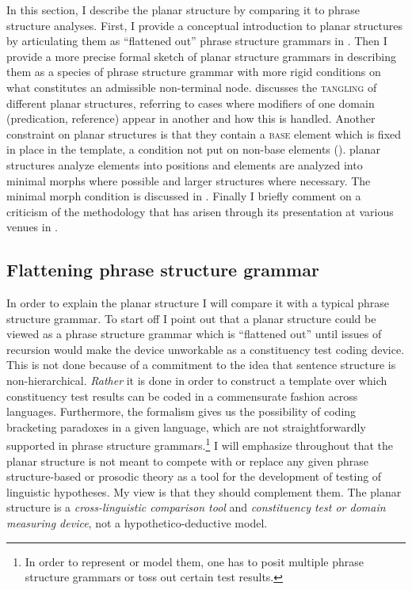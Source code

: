 \documentclass[output=paper,hidelinks]{langscibook}
\begin{document}
In this section, I describe the planar structure by comparing it to phrase structure analyses. First, I provide a conceptual introduction to planar structures by articulating them as ``flattened out'' phrase structure grammars in . Then I provide a more precise formal sketch of planar structure grammars in  describing them as a species of phrase structure grammar with more rigid conditions on what constitutes an admissible non-terminal node.  discusses the \textsc{tangling} of different planar structures, referring to cases where modifiers of one domain (predication, reference) appear in another and how this is handled. Another constraint on planar structures is that they contain a \textsc{base} element which is fixed in place in the template, a condition not put on non-base elements (). planar structures analyze elements into positions and elements are analyzed into minimal morphs where possible and larger structures where necessary. The minimal morph condition is discussed in .
Finally I briefly comment on a criticism of the methodology that has arisen through its presentation at various venues in .

\newpage
\subsection{Flattening phrase structure grammar}
\label{sec:flattening}
In order to explain the planar structure I will compare it with a typical phrase structure grammar. To start off I point out that a planar structure could be viewed as a phrase structure grammar which is ``flattened out'' until issues of recursion would make the device unworkable as a constituency test coding device. This is not done because of a commitment to the idea that sentence structure is non-hierarchical. \textit{Rather} it is done in order to construct a template over which constituency test results can be coded in a commensurate fashion across languages. Furthermore, the formalism gives us the possibility of coding bracketing paradoxes in a given language, which are not straightforwardly supported in phrase structure grammars.\footnote{In order to represent or model them, one has to posit multiple phrase structure grammars \citep{sadock1991autolexical} or toss out certain test results.} I will emphasize throughout that the planar structure is not meant to compete with or replace any given phrase structure-based or prosodic theory as a tool for the development of testing of linguistic hypotheses. My view is that they should complement them. The planar structure is a \textit{cross-linguistic comparison tool} and \textit{constituency test or domain measuring device}, not a hypothetico-deductive model.
\end{document}
